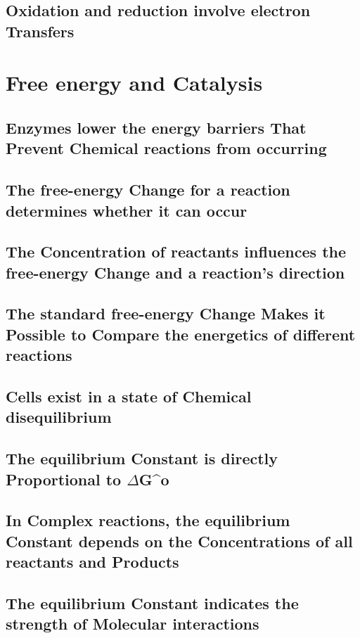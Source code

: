 \subsection{Oxidation and reduction involve electron Transfers}

\section{Free energy and Catalysis}

\subsection{Enzymes lower the energy barriers That Prevent Chemical reactions from occurring}

\subsection{The free-energy Change for a reaction determines whether it can occur}

\subsection{The Concentration of reactants influences the free-energy Change and a reaction’s direction}

\subsection{The standard free-energy Change Makes it Possible to Compare the energetics of different reactions}

\subsection{Cells exist in a state of Chemical disequilibrium}

\subsection{The equilibrium Constant is directly Proportional to $\Delta$G^{o}}

\subsection{In Complex reactions, the equilibrium Constant depends on the Concentrations of all reactants and Products}

\subsection{The equilibrium Constant indicates the strength of Molecular interactions}


